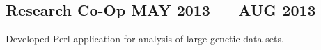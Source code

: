 \subsection{{Research Co-Op \hfill MAY 2013 --- AUG 2013}}
\begin{zitemize}
\item Developed Perl application for analysis of large genetic data sets.
\end{zitemize}
